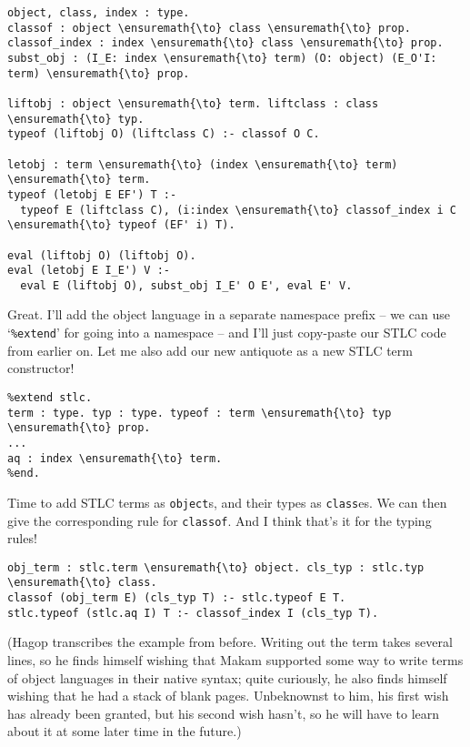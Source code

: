 \begin{verbatim}
object, class, index : type.
classof : object \ensuremath{\to} class \ensuremath{\to} prop.
classof_index : index \ensuremath{\to} class \ensuremath{\to} prop.
subst_obj : (I_E: index \ensuremath{\to} term) (O: object) (E_O'I: term) \ensuremath{\to} prop.

liftobj : object \ensuremath{\to} term. liftclass : class \ensuremath{\to} typ.
typeof (liftobj O) (liftclass C) :- classof O C.

letobj : term \ensuremath{\to} (index \ensuremath{\to} term) \ensuremath{\to} term.
typeof (letobj E EF') T :-
  typeof E (liftclass C), (i:index \ensuremath{\to} classof_index i C \ensuremath{\to} typeof (EF' i) T).

eval (liftobj O) (liftobj O).
eval (letobj E I_E') V :-
  eval E (liftobj O), subst_obj I_E' O E', eval E' V.
\end{verbatim}

\heroADVISOR{} Great. I'll add the object language in a separate namespace
prefix -- we can use `\texttt{\%extend}' for going into a namespace --
and I'll just copy-paste our STLC code from earlier on. Let me also add
our new antiquote as a new STLC term constructor!

\begin{verbatim}
%extend stlc.
term : type. typ : type. typeof : term \ensuremath{\to} typ \ensuremath{\to} prop.
...
aq : index \ensuremath{\to} term.
%end.
\end{verbatim}

\heroSTUDENT{} Time to add STLC terms as \texttt{object}s, and their types as
\texttt{class}es. We can then give the corresponding rule for
\texttt{classof}. And I think that's it for the typing rules!

\begin{verbatim}
obj_term : stlc.term \ensuremath{\to} object. cls_typ : stlc.typ \ensuremath{\to} class.
classof (obj_term E) (cls_typ T) :- stlc.typeof E T.
stlc.typeof (stlc.aq I) T :- classof_index I (cls_typ T).
\end{verbatim}

\begin{scenecomment}
(Hagop transcribes the example from before. Writing out the term takes several lines, so he finds himself
wishing that Makam supported some way to write terms of object languages in their native syntax;
quite curiously, he also finds himself wishing that he had a stack of blank pages.
Unbeknownst to him, his first wish has already been granted, but his second wish hasn't, so he
will have to learn about it at some later time in the future.)
\end{scenecomment}


